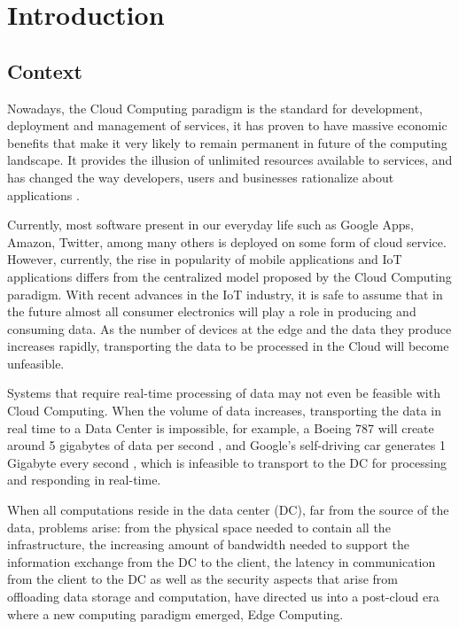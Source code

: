 \newcommand{\novathesis}{\emph{novathesis}}
\newcommand{\novathesisclass}{\texttt{novathesis.cls}}


\chapter{Introduction}
\label{cha:introduction}

\section{Context}

Nowadays, the Cloud Computing paradigm is the standard for development, deployment and management of services, it has proven to have massive economic benefits that make it very likely to remain permanent in future of the computing landscape. It provides the illusion of unlimited resources available to services, and has changed the way developers, users and businesses rationalize about  applications \cite{10.1145/1721654.1721672}.

Currently, most software present in our everyday life such as Google Apps,
Amazon, Twitter, among many others is deployed on some form of cloud service. However, currently, the rise in popularity of mobile applications and IoT applications differs from the centralized model proposed by the Cloud Computing paradigm. With recent advances in the IoT
industry, it is safe to assume that in the future almost all consumer electronics will play a role in producing and consuming data. As the number of devices at the edge and the data they produce increases rapidly, transporting the data to be processed in the Cloud will become unfeasible. 

Systems that require real-time processing of data may not even be feasible with Cloud Computing. When the volume of data increases, transporting the data in real time to a Data Center is impossible, for example, a  Boeing 787 will create around 5 gigabytes of data per second \cite{finnegan_2013}, and Google's self-driving car generates 1 Gigabyte every second \cite{datafloq}, which is infeasible to transport to the DC for processing and responding in real-time. 

When all computations reside in the data center (DC), far from the source of the data, problems arise: from the physical space needed to contain all the infrastructure, the increasing amount of bandwidth needed to support the information exchange from the DC to the client, the latency in communication from the client to the DC as well as the security aspects that arise from offloading data storage and computation, have directed us into a post-cloud era where a new computing paradigm emerged, Edge Computing. 

